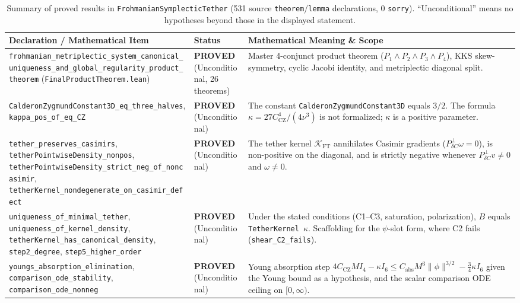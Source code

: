 \documentclass[11pt,a4paper]{article}
\theoremstyle{definition}
\begin{document}
\begin{table}[htbp]
\centering
\caption{Summary of proved results in \texttt{FrohmanianSymplecticTether} (531 source \texttt{theorem}/\texttt{lemma} declarations, 0 \texttt{sorry}). ``Unconditional'' means no hypotheses beyond those in the displayed statement.}
\label{tab:repo2-status}
\small
\begin{tabular}{p{}p{}p{}}
\toprule
\textbf{Declaration / Mathematical Item} & \textbf{Status} & \textbf{Mathematical Meaning \& Scope} \\
\midrule
\texttt{frohmanian\_metriplectic\_system\_canonical\_uniqueness\_and\_global\_regularity\_product\_theorem} (\texttt{FinalProductTheorem.lean}) & \textbf{PROVED} (Unconditional, 26 theorems) & Master 4-conjunct product theorem ($P_1 \wedge P_2 \wedge P_3 \wedge P_4$), KKS skew-symmetry, cyclic Jacobi identity, and metriplectic diagonal split. \\
\addlinespace
\texttt{CalderonZygmundConstant3D\_eq\_three\_halves}, \texttt{kappa\_pos\_of\_eq\_CZ} & \textbf{PROVED} (Unconditional) & The constant \texttt{CalderonZygmundConstant3D} equals $3/2$. The formula $\kappa=27C_{\mathrm{CZ}}^4/(4\nu^3)$ is not formalized; $\kappa$ is a positive parameter. \\
\addlinespace
\texttt{tether\_preserves\_casimirs}, \texttt{tetherPointwiseDensity\_nonpos}, \texttt{tetherPointwiseDensity\_strict\_neg\_of\_noncasimir}, \texttt{tetherKernel\_nondegenerate\_on\_casimir\_defect} & \textbf{PROVED} (Unconditional) & The tether kernel $\mathcal{K}_{\mathrm{FT}}$ annihilates Casimir gradients ($P_{\delta C}^\perp \omega = 0$), is non-positive on the diagonal, and is strictly negative whenever $P_{\delta C}^\perp v \neq 0$ and $\omega \neq 0$. \\
\addlinespace
\texttt{uniqueness\_of\_minimal\_tether}, \texttt{uniqueness\_of\_kernel\_density}, \texttt{tetherKernel\_has\_canonical\_density}, \texttt{step2\_degree}, \texttt{step5\_higher\_order} & \textbf{PROVED} (Unconditional) & Under the stated conditions (C1--C3, saturation, polarization), $B$ equals \texttt{TetherKernel}~$\kappa$. Scaffolding for the $\psi$-slot form, where C2 fails (\texttt{shear\_C2\_fails}). \\
\addlinespace
\texttt{youngs\_absorption\_elimination}, \texttt{comparison\_ode\_stability}, \texttt{comparison\_ode\_nonneg} & \textbf{PROVED} (Unconditional) & Young absorption step $4C_{\mathrm{CZ}}MI_4-\kappa I_6\le C_{\mathrm{abs}}M^3\|\phi\|^{3/2}-\frac34\kappa I_6$ given the Young bound as a hypothesis, and the scalar comparison ODE ceiling on $[0,\infty)$. \\

\end{tabular}
\end{table}
\end{document}
